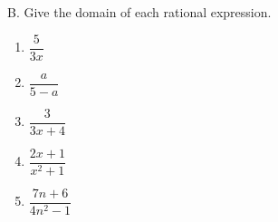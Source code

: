 B. Give the domain of each rational expression. 
\begin{enumerate}[label = \arabic*. ]
\item \hspce $\dfrac{5}{3x}$ 
\item \hspce $\dfrac{a}{5-a}$ 
\item \hspce $\dfrac{3}{3x+4}$ 
\item \hspce $\dfrac{2x+1}{x^2+1}$ 
\item \hspce $\dfrac{7n+6}{4n^2-1}$ 
\end{enumerate} 